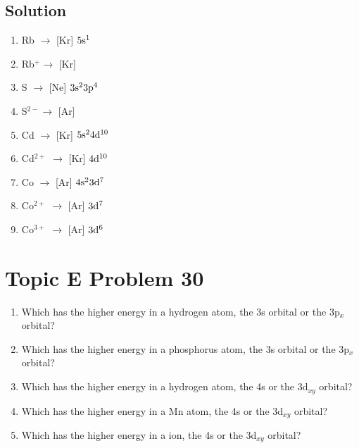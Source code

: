 \documentclass[10pt]{article}
\begin{document}
        \subsection{Solution}
            \begin{multicols}{2}
                \begin{enumerate}[label=\alph*/]
                    \item   Rb $\to$    [Kr] $\rm 5s^1$
                    \item   Rb$^+ \to$  [Kr]
                    \item   S $\to$     [Ne] $\rm 3s^2 3p^4$
                    \item   S$^{2-}\to$ [Ar]
                    \item   Cd $\to$    [Kr] $\rm 5s^2 4d^{10}$
                    \item   Cd$^{2+}$ $\to$ [Kr] $\rm 4d^{10}$
                    \item   Co $\to$    [Ar] $\rm 4s^2 3d^7$
                    \item   Co$^{2+}$ $\to$ [Ar] $\rm 3d^7$
                    \item   Co$^{3+}$ $\to$ [Ar] $\rm 3d^6$
                \end{enumerate}
            \end{multicols}

    \pagebreak
    \section{Topic E Problem 30}
        \begin{enumerate}[label=\alph*)]
            \item   Which has the higher energy in a hydrogen atom, the 3s orbital or the 3p$_x$ orbital?
            \item   Which has the higher energy in a phosphorus atom, the 3s orbital or the 3p$_x$ orbital?
            \item   Which has the higher energy in a hydrogen atom, the 4s or the 3d$_{xy}$ orbital?
            \item   Which has the higher energy in a Mn atom, the 4s or the 3d$_{xy}$ orbital?
            \item   Which has the higher energy in a  ion, the 4s or the 3d$_{xy}$ orbital?
        \end{enumerate}
\end{document}
